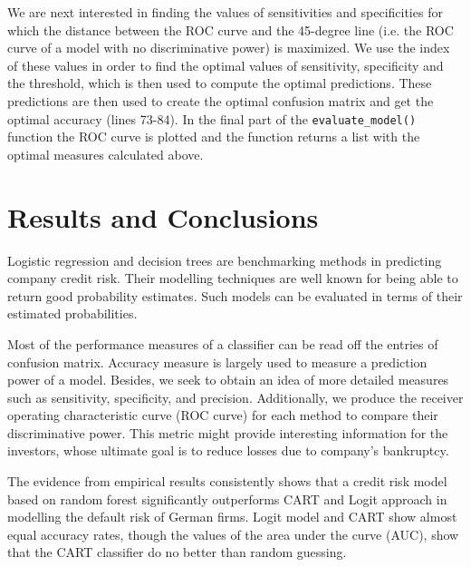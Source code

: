 \documentclass{article}
\begin{document}
We are next interested in finding the values of sensitivities and specificities for which the distance between the ROC curve and the 45-degree line (i.e. the ROC curve of a model with no discriminative power) is maximized. We use the index of these values in order to find the optimal values of sensitivity, specificity and the threshold, which is then used to compute the optimal predictions. These predictions are then used to create the optimal confusion matrix and get the optimal accuracy (lines 73-84). In the final part of the \texttt{evaluate\_model()} function the ROC curve is plotted and the function returns a list with the optimal measures calculated above.


\section{Results and Conclusions}


Logistic regression and decision trees are benchmarking methods in predicting company credit risk. Their modelling techniques are well known for being able to return good probability estimates. Such models can be evaluated in terms of their estimated probabilities. 

Most of the performance measures of a classifier can be read off the entries of confusion matrix. Accuracy measure is largely used to measure a prediction power of a model. Besides, we seek to obtain an idea of more detailed measures such as sensitivity, specificity, and precision. Additionally, we produce the receiver operating characteristic curve (ROC curve) for each method to compare their discriminative power. This metric might provide interesting information for the investors, whose ultimate goal is to reduce losses due to company's bankruptcy. 

The evidence from empirical results consistently shows that a credit risk model based on random forest significantly outperforms CART and Logit approach in modelling the default risk of German firms. Logit model and CART show almost equal accuracy rates, though the values of the area under the curve (AUC), show that the CART classifier do no better than random guessing.
\end{document}
